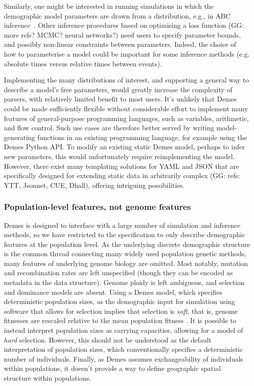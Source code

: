 \documentclass[11pt]{article}
\newcommand{\ggcomment}[1]{{\textcolor{yellow!60!red}{GG: #1}}}
\begin{document}
Similarly, one might be interested in running simulations in which
the demographic model parameters are drawn from a distribution, e.g.,
in ABC inference~\citep{beaumont2002approximate}.
Other inference procedures based on optimising a loss function
\citep{gutenkunst2009inferring,kamm2017efficient,jouganous2017inferring}
(\ggcomment{more refs? MCMC? neural networks?})
need users to specify parameter bounds,
and possibly non-linear constraints between parameters.
Indeed, the choice of how to parameterise a model could be important for
some inference methods (e.g. absolute times versus relative times between events).

Implementing the many distributions of interest, and supporting a general
way to describe a model's free parameters, would greatly increase the
complexity of parsers, with relatively limited benefit to most users.
It's unlikely that Demes could be made sufficiently
flexible without considerable effort to implement many features of
general-purpose programming languages, such as variables, arithmetic,
and flow control.
Such use cases are therefore better served by writing model-generating
functions in an existing programming language, for example
using the Demes Python API.
To modify an existing static Demes model, perhaps to infer new parameters,
this would unfortunately require reimplementing the model.
However, there exist many templating solutions for YAML and JSON that are
specifically designed for extending static data in arbitrarily complex
(\ggcomment{refs: YTT, Jsonnet, CUE, Dhall}),
offering intriguing possibilities.


\subsubsection*{Population-level features, not genome features}
Demes is designed to interface with a large number of simulation and inference
methods, so we have restricted to the specification to only describe
demographic features at the population level. As the underlying discrete
demographic structure is the common thread connecting many widely used
population genetic methods, many features of underlying genome biology are
omitted. Most notably, mutation and recombination rates are left unspecified
(though they can be encoded as metadata in the data structure). Genome ploidy
is left ambiguous, and selection and dominance models are absent. Using a Demes
model, which specifies deterministic population sizes, as the demographic input
for simulation using software that allows for selection implies that selection
is \emph{soft}, that is, genome fitnesses are rescaled relative to the mean
population fitness \citep{christiansen1975hard}. It is possible to instead
interpret population sizes as carrying capacities, allowing for a model of
\emph{hard} selection. However, this should not be understood as the default
interpretation of population sizes, which conventionally specifies a
deterministic number of individuals. Finally, as Demes assumes exchangeability
of individuals within populations, it doesn't provide a way to define geographic
spatial structure within populations.
\end{document}
